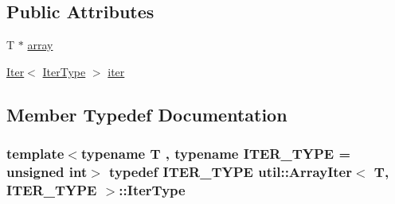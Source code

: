 \subsection*{Public Attributes}
\begin{DoxyCompactItemize}
\item 
T $\ast$ \hyperlink{structutil_1_1ArrayIter_a4915fb20478162c0dc345d3c9dae2869}{array}
\item 
\hyperlink{structutil_1_1Iter}{Iter}$<$ \hyperlink{structutil_1_1ArrayIter_a6ff2ec73e2fd7bb312b4f505ad91bdbc}{Iter\-Type} $>$ \hyperlink{structutil_1_1ArrayIter_aa1bbd6172481bcc23bf48f860a68e40d}{iter}
\end{DoxyCompactItemize}


\subsection{Member Typedef Documentation}
\hypertarget{structutil_1_1ArrayIter_a6ff2ec73e2fd7bb312b4f505ad91bdbc}{
\subsubsection[{Iter\-Type}]{\setlength{\rightskip}{0pt plus 5cm}template$<$typename T , typename I\-T\-E\-R\-\_\-\-T\-Y\-P\-E  = unsigned int$>$ typedef I\-T\-E\-R\-\_\-\-T\-Y\-P\-E {\bf util\-::\-Array\-Iter}$<$ T, I\-T\-E\-R\-\_\-\-T\-Y\-P\-E $>$\-::{\bf Iter\-Type}}}\label{structutil_1_1ArrayIter_a6ff2ec73e2fd7bb312b4f505ad91bdbc}


